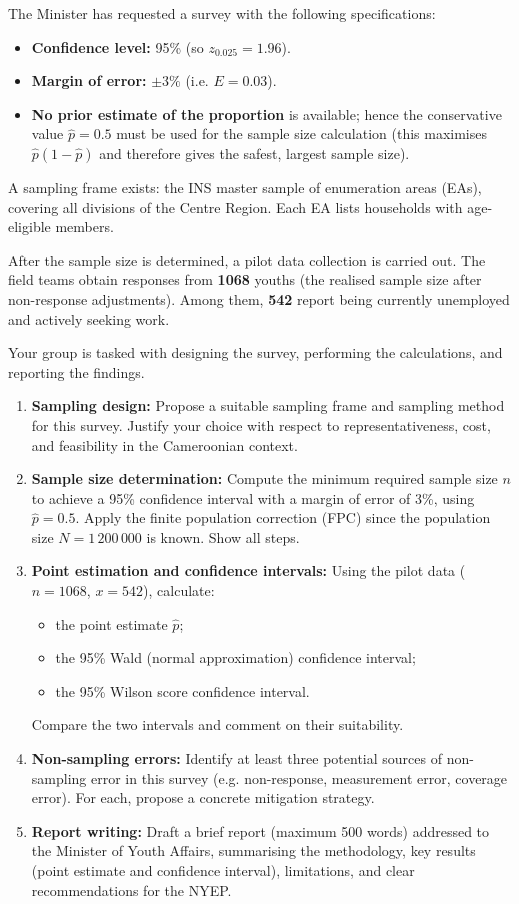 \documentclass[11pt]{article}
\newcommand{\cle}[1]{{\popxbold\color{popdark}#1}}
\newcounter{popsec}
\newcounter{popsub}
\newcommand{\courssub}[1]{%
  \stepcounter{popsub}%
  \par\vspace{9pt}\noindent{\popxbold\fontsize{11.5}{13}\selectfont\color{popink}{\color{poporange}\thepopsec.\thepopsub}\hspace{6pt}#1}\par\nopagebreak\vspace{4pt}
}
\begin{document}
The Minister has requested a survey with the following specifications:
\begin{itemize}
    \item \textbf{Confidence level:} 95\% (so $z_{0.025}=1.96$).
    \item \textbf{Margin of error:} $\pm 3\%$ (i.e. $E = 0.03$).
    \item \textbf{No prior estimate of the proportion} is available; hence the conservative value $\hat{p}=0.5$ must be used for the sample size calculation (this maximises $\hat{p}(1-\hat{p})$ and therefore gives the safest, largest sample size).
\end{itemize}

A sampling frame exists: the INS master sample of enumeration areas (EAs), covering all divisions of the Centre Region. Each EA lists households with age-eligible members.

After the sample size is determined, a pilot data collection is carried out. The field teams obtain responses from \textbf{1068} youths (the realised sample size after non-response adjustments). Among them, \textbf{542} report being currently unemployed and actively seeking work.

Your group is tasked with designing the survey, performing the calculations, and reporting the findings.

\courssub{Tasks}
\begin{enumerate}
    \item \textbf{Sampling design:} Propose a suitable \cle{sampling frame} and \cle{sampling method} for this survey. Justify your choice with respect to representativeness, cost, and feasibility in the Cameroonian context.
    \item \textbf{Sample size determination:} Compute the minimum required sample size $n$ to achieve a 95\% confidence interval with a margin of error of 3\%, using $\hat{p}=0.5$. Apply the finite population correction (FPC) since the population size $N=1\,200\,000$ is known. Show all steps.
    \item \textbf{Point estimation and confidence intervals:} Using the pilot data ($n=1068$, $x=542$), calculate:
        \begin{itemize}
            \item the point estimate $\hat{p}$;
            \item the 95\% Wald (normal approximation) confidence interval;
            \item the 95\% Wilson score confidence interval.
        \end{itemize}
        Compare the two intervals and comment on their suitability.
    \item \textbf{Non-sampling errors:} Identify at least three potential sources of non-sampling error in this survey (e.g. non-response, measurement error, coverage error). For each, propose a concrete mitigation strategy.
    \item \textbf{Report writing:} Draft a brief report (maximum 500 words) addressed to the Minister of Youth Affairs, summarising the methodology, key results (point estimate and confidence interval), limitations, and clear recommendations for the NYEP.
\end{enumerate}
\end{document}
